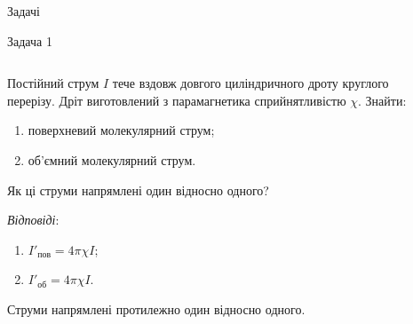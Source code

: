 \documentclass[onlytextwidth]{beamer}
\begin{document}
\begin{frame}{Задачі}{}
	\begin{exampleblock}{\scriptsize Задача 1}
		\begin{columns}
			\begin{column}{0.75\linewidth}\justifying\scriptsize
				Постійний струм $I$ тече вздовж довгого циліндричного дроту круглого перерізу. Дріт виготовлений з парамагнетика сприйнятливістю $\chi$.
				Знайти:
				\begin{enumerate}
					\item поверхневий молекулярний струм;
					\item об'ємний молекулярний струм.
				\end{enumerate}
				Як ці струми напрямлені один відносно одного?
				\bigskip

				\textit{Відповіді}:

				\begin{enumerate}
					\item $I'_\text{пов} = 4\pi\chi I$;
					\item $I'_\text{об} = 4\pi\chi I$.
				\end{enumerate}
				Струми напрямлені протилежно один відносно одного.

			\end{column}
			\begin{column}{0.25\linewidth}\centering
\end{column}
\end{columns}
\end{exampleblock}
\end{frame}
\end{document}
